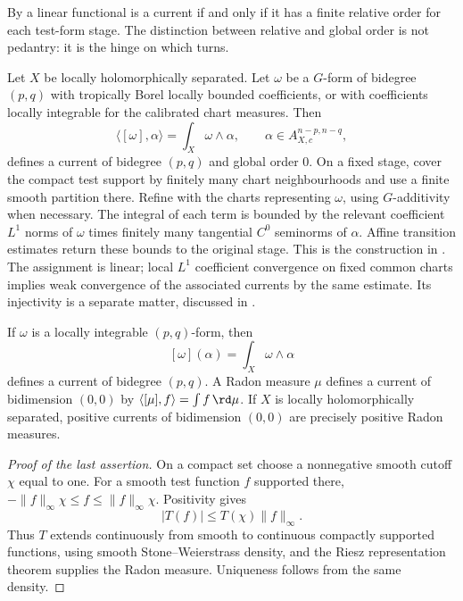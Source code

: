 By  a linear functional is a current
if and only if it has a finite relative order for each test-form stage.  The
distinction between relative and global order is not pedantry: it is the
hinge on which  turns.

\begin{example}
\label{ex:ch14-l1-current}
Let $X$ be locally holomorphically separated. Let $\omega$ be a $G$-form of
bidegree $(p,q)$ with tropically Borel locally bounded coefficients, or
with coefficients locally integrable for the calibrated chart measures.
Then
\[
 \langle[\omega],\alpha\rangle=\int_X\omega\wedge\alpha,
 \qquad \alpha\in A_{X,c}^{n-p,n-q},
\]
defines a current of bidegree $(p,q)$ and global order $0$. On a fixed
stage, cover the compact test support by finitely many chart
neighbourhoods and use a finite smooth partition there. Refine with the
charts representing $\omega$, using $G$-additivity when necessary.
The integral of each term is bounded by the relevant coefficient
$L^1$ norms of $\omega$ times finitely many tangential $C^0$ seminorms
of $\alpha$. Affine transition estimates return these bounds to the
original stage. This is the construction in \cite[\S7.3]{CLD25}.
The assignment is linear; local $L^1$ coefficient convergence on fixed
common charts implies weak convergence of the associated currents by
the same estimate. Its injectivity is a separate matter, discussed in
.
\end{example}

\begin{example}
\label{ex:ch14-forms-and-measures}
If $\omega$ is a locally integrable $(p,q)$-form, then
\[
               [\omega](\alpha)=\int_X\omega\wedge\alpha
\]
defines a current of bidegree $(p,q)$.  A Radon measure $\mu$ defines a
current of bidimension $(0,0)$ by
$\langle[\mu],f\rangle=\int f\,\rd \mu$.  If $X$ is locally holomorphically separated, positive currents of
bidimension $(0,0)$ are precisely positive Radon measures.
\end{example}

\begin{proof}[Proof of the last assertion]
On a compact set choose a nonnegative smooth cutoff $\chi$ equal to one.
For a smooth test function $f$ supported there,
$-\|f\|_\infty\chi\leq f\leq\|f\|_\infty\chi$.  Positivity gives
\[
                  |T(f)|\leq T(\chi)\|f\|_\infty.
\]
Thus $T$ extends continuously from smooth to continuous compactly supported
functions, using smooth Stone--Weierstrass density, and the Riesz
representation theorem supplies the Radon measure.  Uniqueness follows from
the same density.
\end{proof}

